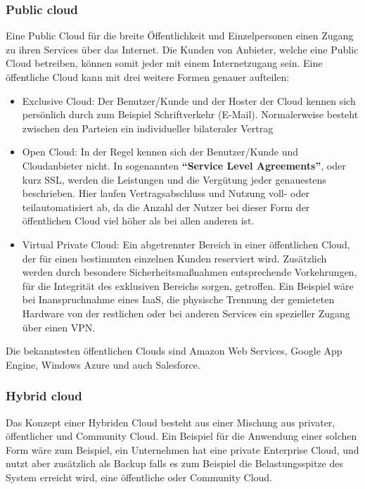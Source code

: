 \subsubsection{Public cloud}
Eine Public Cloud für die breite Öffentlichkeit und Einzelpersonen einen Zugang zu ihren Services über das Internet. Die Kunden von Anbieter, welche eine Public Cloud betreiben, können somit jeder mit einem Internetzugang sein. Eine öffentliche Cloud kann mit drei weitere Formen genauer aufteilen:
\begin{itemize}
	\item Exclusive Cloud: Der Benutzer/Kunde und der Hoster der Cloud kennen sich persönlich durch zum Beispiel Schriftverkehr (E-Mail). Normalerweise besteht zwischen den Parteien ein individueller bilateraler Vertrag
	\item Open Cloud: In der Regel kennen sich der Benutzer/Kunde und Cloudanbieter nicht. In sogenannten \textbf{"`Service Level Agreements"'}, oder kurz SSL, werden die Leistungen und die Vergütung jeder genauestens beschrieben. Hier laufen Vertragsabschluss und Nutzung voll- oder teilautomatisiert ab, da die Anzahl der Nutzer bei dieser Form der öffentlichen Cloud viel höher als bei allen anderen ist.
	\item Virtual Private Cloud: Ein abgetrennter Bereich in einer öffentlichen Cloud, der für einen bestimmten einzelnen Kunden reserviert wird. Zusätzlich werden durch besondere Sicherheitsmaßnahmen entsprechende Vorkehrungen, für die Integrität des exklusiven Bereichs sorgen, getroffen. Ein Beispiel wäre bei Inanspruchnahme eines IaaS, die physische Trennung der gemieteten Hardware von der restlichen oder bei anderen Services ein spezieller Zugang über einen VPN.
\end{itemize}

Die bekanntesten öffentlichen Clouds sind Amazon Web Services, Google App Engine, Windows Azure und auch Salesforce.

\subsubsection{Hybrid cloud}
Das Konzept einer Hybriden Cloud besteht aus einer Mischung aus privater, öffentlicher und Community Cloud. Ein Beispiel für die Anwendung einer solchen Form wäre zum Beispiel, ein Unternehmen hat eine private Enterprise Cloud, und nutzt aber zusätzlich als Backup falls es zum Beispiel die Belastungsspitze des System erreicht wird, eine öffentliche oder Community Cloud.

